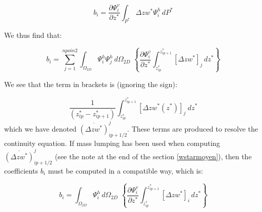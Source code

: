 \begin{equation}
b_{i}=\dfrac{\partial\Psi_{i}^{v}}{\partial z^{\ast}}\int\nolimits_{P^{\ast}%
}\Delta zw^{\ast}\Psi_{i}^{h}\,dP^{\ast}%
\end{equation}


We thus find that:%

\begin{equation}
b_{i}=\sum\limits_{j=1}^{npoin2}\int\nolimits_{\Omega_{2D}}\Psi_{i}^{h}%
\Psi_{j}^{h}\,d\Omega_{2D}\,\,\left\{  \dfrac{\partial\Psi_{i}^{v}}{\partial
z^{\ast}}\int\nolimits_{z_{ip}^{\ast}}^{z_{ip+1}^{\ast}}\left[  \Delta
zw^{\ast}\right]  _{j}\,dz^{\ast}\right\}
\end{equation}


We see that the term in brackets is (ignoring the sign):%

\begin{equation}
\dfrac{1}{(z_{ip}^{\ast}-z_{ip+1}^{\ast})}\int\nolimits_{z_{ip}^{\ast}%
}^{z_{ip+1}^{\ast}}\left[  \Delta zw^{\ast}(z^{\ast})\right]  _{j}~dz^{\ast}%
\end{equation}
which we have denoted $\overline{\left(  \Delta zw^{\ast}\right)}_{ip+1/2}^{j}$.
These terms are produced to resolve the continuity equation.
If mass lumping has been used when computing $\overline{\left(\Delta zw^{\ast}\right)}_{ip+1/2}^{j}$
(see the note at the end of the section \ref{wstarmoyen}), then the coefficients $b_{i}$ must be computed in a
compatible way, which is:%

\begin{equation}
b_{i}=\int\nolimits_{\Omega_{2D}}\Psi_{i}^{h}\,d\Omega_{2D}\,\,\left\{
\dfrac{\partial\Psi_{i}^{v}}{\partial z^{\ast}}\int\nolimits_{z_{ip}^{\ast}%
}^{z_{ip+1}^{\ast}}\left[  \Delta zw^{\ast}\right]  _{i}\,dz^{\ast}\right\}
\end{equation}


